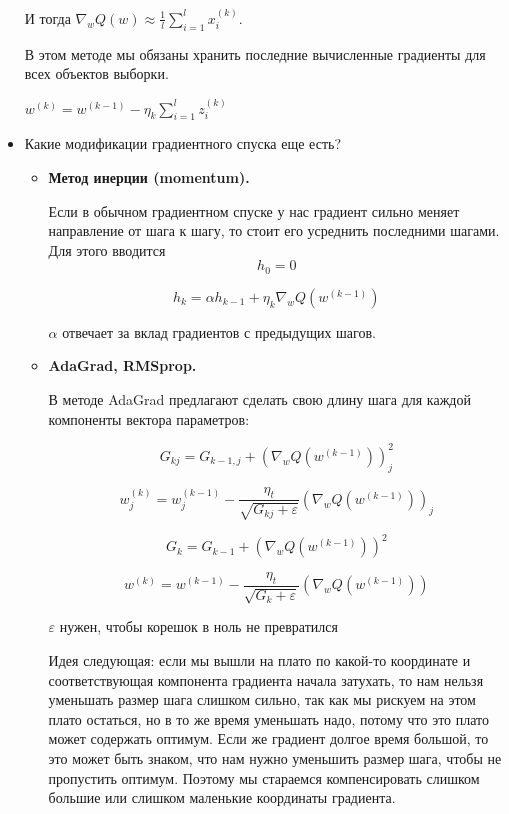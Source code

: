 \documentclass[a4paper]{article}
\begin{document}
\begin{itemize}
\begin{itemize}
\end{itemize}

И тогда $\nabla_w Q(w) \approx \frac{1}{l} \sum_{i=1}^l x_i^{(k)}$.

В этом методе мы обязаны хранить последние вычисленные градиенты для всех объектов выборки.

$w^{(k)} = w^{(k-1)} - \eta_k \sum_{i=1}^l z_i^{(k)}$


\item Какие модификации градиентного спуска еще есть?

\begin{itemize}

\item \textbf{Метод инерции (momentum).}

Если в обычном градиентном спуске у нас градиент сильно меняет направление от шага к шагу, то стоит его усреднить последними шагами. Для этого вводится 
\[ h_0 = 0 \]

\[ h_k = \alpha h_{k-1} + \eta_k \nabla_w Q(w^{(k-1)})\]

$\alpha$ отвечает за вклад градиентов с предыдущих шагов.

\item \textbf{AdaGrad, RMSprop.}

В методе AdaGrad предлагают сделать свою длину шага для каждой компоненты вектора параметров:

\[ G_{kj} = G_{k-1, j} + \left( \nabla_w Q(w^{(k-1)} ) \right)_j^2 \]

\[ w_j^{(k)} = w_j^{(k-1)} - \frac{\eta_t}{\sqrt{G_{kj}+\varepsilon}} \left( \nabla_w Q(w^{(k-1)}) \right)_j \]

\[ G_{k} = G_{k-1} + \left( \nabla_w Q(w^{(k-1)} ) \right)^2 \]

\[ w^{(k)} = w^{(k-1)} - \frac{\eta_t}{\sqrt{G_{k}+\varepsilon}} \left( \nabla_w Q(w^{(k-1)}) \right) \]


$\varepsilon$ нужен, чтобы корешок в ноль не превратился

Идея следующая: если мы вышли на плато по какой-то координате и соответствующая компонента градиента начала затухать, то нам нельзя уменьшать размер шага слишком сильно, так как мы рискуем на этом плато остаться, но в то же время уменьшать надо, потому что это плато может содержать оптимум. Если же градиент долгое время большой, то это может быть знаком, что нам нужно уменьшить размер шага, чтобы не пропустить оптимум. Поэтому мы стараемся компенсировать слишком большие или слишком маленькие координаты градиента.


\end{itemize}
\end{itemize}
\end{document}
